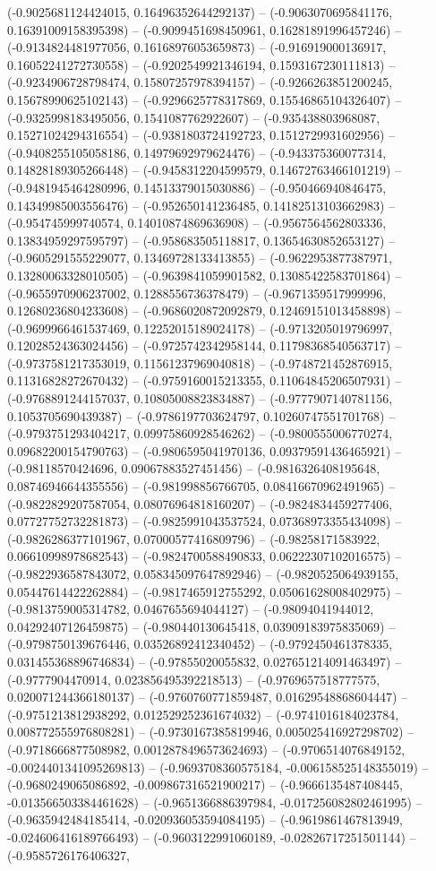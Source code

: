 (-0.9025681124424015, 0.16496352644292137) -- (-0.9063070695841176, 0.16391009158395398) -- (-0.9099451698450961, 0.16281891996457246) -- (-0.9134824481977056, 0.16168976053659873) -- (-0.916919000136917, 0.16052241272730558) -- (-0.9202549921346194, 0.1593167230111813) -- (-0.9234906728798474, 0.15807257978394157) -- (-0.9266263851200245, 0.15678990625102143) -- (-0.9296625778317869, 0.15546865104326407) -- (-0.9325998183495056, 0.1541087762922607) -- (-0.935438803968087, 0.15271024294316554) -- (-0.9381803724192723, 0.1512729931602956) -- (-0.9408255105058186, 0.14979692979624476) -- (-0.943375360077314, 0.14828189305266448) -- (-0.9458312204599579, 0.14672763466101219) -- (-0.9481945464280996, 0.14513379015030886) -- (-0.950466940846475, 0.14349985003556476) -- (-0.952650141236485, 0.14182513103662983) -- (-0.954745999740574, 0.14010874869636908) -- (-0.9567564562803336, 0.13834959297595797) -- (-0.958683505118817, 0.13654630852653127) -- (-0.9605291555229077, 0.13469728133413855) -- (-0.9622953877387971, 0.13280063328010505) -- (-0.9639841059901582, 0.13085422583701864) -- (-0.9655970906237002, 0.1288556736378479) -- (-0.9671359517999996, 0.12680236804233608) -- (-0.9686020872092879, 0.12469151013458898) -- (-0.9699966461537469, 0.12252015189024178) -- (-0.9713205019796997, 0.12028524363024456) -- (-0.9725742342958144, 0.11798368540563717) -- (-0.9737581217353019, 0.11561237969040818) -- (-0.9748721452876915, 0.11316828272670432) -- (-0.9759160015213355, 0.11064845206507931) -- (-0.9768891244157037, 0.10805008823834887) -- (-0.9777907140781156, 0.1053705690439387) -- (-0.9786197703624797, 0.10260747551701768) -- (-0.9793751293404217, 0.09975860928546262) -- (-0.9800555006770274, 0.09682200154790763) -- (-0.9806595041970136, 0.09379591436465921) -- (-0.98118570424696, 0.09067883527451456) -- (-0.9816326408195648, 0.08746946644355556) -- (-0.981998856766705, 0.08416670962491965) -- (-0.9822829207587054, 0.08076964818160207) -- (-0.9824834459277406, 0.07727752732281873) -- (-0.9825991043537524, 0.07368973355434098) -- (-0.9826286377101967, 0.07000577416809796) -- (-0.98258171583922, 0.06610998978682543) -- (-0.9824700588490833, 0.06222307102016575) -- (-0.9822936587843072, 0.058345097647892946) -- (-0.9820525064939155, 0.05447614422262884) -- (-0.9817465912755292, 0.05061628008402975) -- (-0.9813759005314782, 0.0467655694044127) -- (-0.98094041944012, 0.04292407126459875) -- (-0.980440130645418, 0.03909183975835069) -- (-0.9798750139676446, 0.03526892412340452) -- (-0.9792450461378335, 0.031455368896746834) -- (-0.97855020055832, 0.027651214091463497) -- (-0.9777904470914, 0.023856495392218513) -- (-0.9769657518777575, 0.020071244366180137) -- (-0.9760760771859487, 0.01629548868604447) -- (-0.9751213812938292, 0.012529252361674032) -- (-0.9741016184023784, 0.008772555976808281) -- (-0.9730167385819946, 0.005025416927298702) -- (-0.9718666877508982, 0.0012878496573624693) -- (-0.9706514076849152, -0.0024401341095269813) -- (-0.9693708360575184, -0.006158525148355019) -- (-0.9680249065086892, -0.009867316521900217) -- (-0.9666135487408445, -0.013566503384461628) -- (-0.9651366886397984, -0.017256082802461995) -- (-0.9635942484185414, -0.020936053594084195) -- (-0.9619861467813949, -0.024606416189766493) -- (-0.9603122991060189, -0.02826717251501144) -- (-0.9585726176406327, 